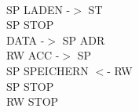\documentclass[a4paper,36pt,extrafontsizes]{memoir}
\begin{document}
~\\
SP LADEN -$>$ ST\\
SP STOP\\
DATA -$>$ SP ADR\\
RW ACC -$>$ SP\\
SP SPEICHERN $<$- RW\\
SP STOP\\
RW STOP\\
\end{document}
